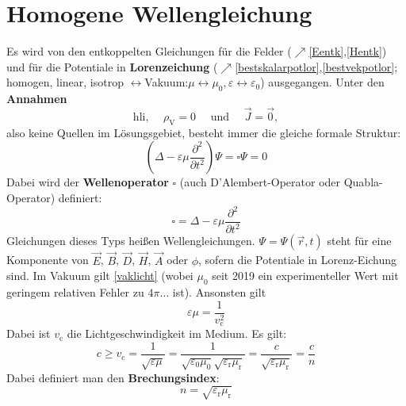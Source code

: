  \section{Homogene Wellengleichung}
	  Es wird von den entkoppelten Gleichungen für die Felder ($\nearrow$\ref{Eentk},\ref{Hentk}) und für die Potentiale in \textbf{Lorenzeichung} ($\nearrow$\ref{bestskalarpotlor},\ref{bestvekpotlor}; homogen, linear, isotrop $\leftrightarrow$Vakuum:$\mu\leftrightarrow\mu_0,\varepsilon\leftrightarrow\varepsilon_0$) ausgegangen. Unter den \textbf{Annahmen} 
	  \begin{equation}\label{annhomwell}
	  \text{hli, }\quad\rho_\text{V}=0 \quad \text{ und }\quad\vec{J}=\vec{0},
	  \end{equation}
	   also keine Quellen im Lösungsgebiet, besteht immer die gleiche formale Struktur:
		        \begin{equation}\label{homwell}
			       \boxed{ (\Delta -\varepsilon\mu\frac{\partial^2}{\partial t^2})\Psi = \square\Psi = 0    }
		        \end{equation}
		        Dabei wird der \textbf{Wellenoperator} $\square$ (auch D'Alembert-Operator oder Quabla-Operator) definiert:
		        \begin{equation}
		        	\boxed{\square = \Delta - \varepsilon\mu\frac{\partial^2}{\partial t^2}}
		        \end{equation}
		        Gleichungen dieses Typs heißen Wellengleichungen. \(\Psi = \Psi(\vec{r} , t)\) steht für eine Komponente von \(\vec{E}\), \(\vec{B} \), \(\vec{D} \), \(\vec{H} \), \( \vec{A}\) oder \(\phi\), sofern die Potentiale in Lorenz-Eichung sind. Im Vakuum gilt \ref{vaklicht} (wobei $\mu_0$ seit 2019 ein experimenteller Wert mit geringem relativen Fehler zu $4\pi \dots$ ist). Ansonsten gilt
		        \begin{equation}\label{geschwepsmu}
		        \boxed{	\varepsilon\mu = \frac{1}{ v_\mathrm{c}^2}}
		        \end{equation}
		       Dabei ist \( v_\mathrm{c}\) die Lichtgeschwindigkeit im Medium. Es gilt:
		        \begin{equation}
			        c\ge  v_\mathrm{c} = \frac{1}{\sqrt{\varepsilon\mu}} = \frac{1}{\sqrt{\varepsilon_0\mu_0}\sqrt{\varepsilon_\mathrm{r}\mu_\mathrm{r}}} = \frac{c}{\sqrt{\varepsilon_\mathrm{r}\mu_\mathrm{r}}} =\frac{c}{n}     
		        \end{equation}
		        Dabei definiert man den \textbf{Brechungsindex}:
		        \begin{equation}
		        	\boxed{n = \sqrt{\varepsilon_\mathrm{r}\mu_\mathrm{r}}}
		        \end{equation} 
